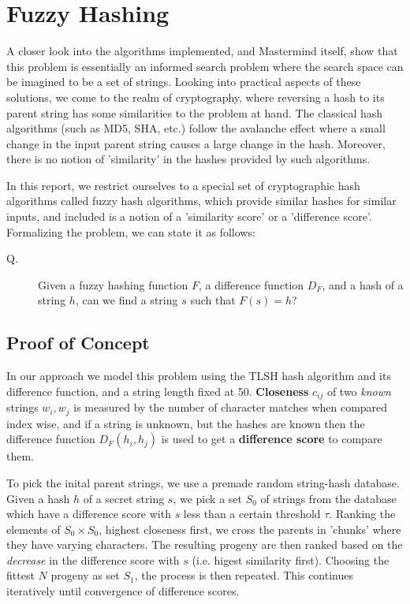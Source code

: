 \documentclass[]{article}
\begin{document}
	\section{Fuzzy Hashing}
		A closer look into the algorithms implemented, and Mastermind itself, show that this problem is essentially an informed search problem where the search space can be imagined to be a set of strings. Looking into practical aspects of these solutions, we come to the realm of cryptography, where reversing a hash to its parent string has some similarities to the problem at hand. The classical hash algorithms (such as MD5, SHA, etc.) follow the avalanche effect where a small change in the input parent string causes a large change in the hash. Moreover, there is no notion of 'similarity' in the hashes provided by such algorithms.
		
		In this report, we restrict ourselves to a special set of cryptographic hash algorithms called fuzzy hash algorithms, which provide similar hashes for similar inputs, and included is a notion of a 'similarity score' or a 'difference score'.
		Formalizing the problem, we can state it as follows:
		\begin{description}
			\item[Q.] Given a fuzzy hashing function $F$, a difference function $D_F$, and a hash of a string $h$, can we find a string $s$ such that $F(s) = h$?
		\end{description}
		
		\subsection{Proof of Concept}
		
		In our approach we model this problem using the TLSH hash algorithm and its difference function, and a string length fixed at 50.  \textbf{Closeness} $c_{ij}$ of two \textit{known} strings $w_i, w_j$ is measured by the number of character matches when compared index wise, and if a string is unknown, but the hashes are known then the difference function $D_F(h_i, h_j)$ is used to get a \textbf{difference score} to compare them.
		
		To pick the inital parent strings, we use a premade random string-hash database. Given a hash $h$ of a secret string $s$, we pick a set $S_0$ of strings from the database which have a difference score with $s$ less than a certain threshold $\tau$. Ranking the elements of $S_0 \times S_0$, highest closeness first, we cross the parents in 'chunks' where they have varying characters. The resulting progeny are then ranked based on the \textit{decrease} in the difference score with $s$ (i.e. higest similarity first). Choosing the fittest $N$ progeny as set $S_1$, the process is then repeated. This continues iteratively until convergence of difference scores.
		
\end{document}
